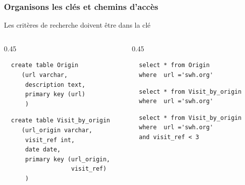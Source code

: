 \begin{frame}[fragile] \frametitle{Organisons les clés et chemins d'accès}

Les critères de recherche doivent être dans la clé

\vfill
\begin{columns}
    \begin{column}{0.45\textwidth}
  \begin{verbatim}
  create table Origin 
     (url varchar, 
      description text,
      primary key (url)
      )
  \end{verbatim}
  
  \begin{verbatim}
  create table Visit_by_origin
     (url_origin varchar,
      visit_ref int,
      date date,
      primary key (url_origin, 
                   visit_ref)
      )
  \end{verbatim}
  \end{column}
 \begin{column}{0.45\textwidth}

  \begin{verbatim}
  select * from Origin 
  where  url ='swh.org'
  \end{verbatim}
  
  \vfill
    \begin{verbatim}
  select * from Visit_by_origin 
  where  url ='swh.org'
  \end{verbatim}
    \vfill
   
  \begin{verbatim}
  select * from Visit_by_origin 
  where  url ='swh.org'
  and visit_ref < 3
  \end{verbatim}
    
\end{column}
\end{columns}

\end{frame}
	
